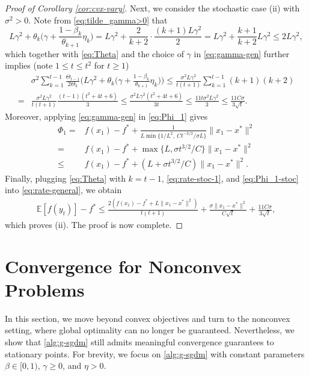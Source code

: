 \documentclass[10pt]{article}
\numberwithin{equation}{section}
\theoremstyle{definition}
\newcommand{\ebb}{\mathbb{E}}  %
\begin{document}
\begin{proof}[Proof of Corollary \ref{cor:cvx-vary}]
    Next, we consider the stochastic case (ii) with $\sigma^2>0$. Note from \eqref{eq:tilde_gamma>0} that
    \begin{equation*}
        L \gamma^2+\theta_k\Big(\gamma+\frac{1-\beta_k}{\theta_{k+1}}\eta_k\Big)= L\gamma^2+\frac{2}{k+2}\cdot\frac{(k+1) L \gamma^2}{2} = L\gamma^2+\frac{k+1}{k+2}L\gamma^2\leq 2L\gamma^2,
    \end{equation*}
    which together with \eqref{eq:Theta} and the choice of $\gamma$ in \eqref{eq:gamma-gen} further implies (note $1\leq t\leq t^2$ for $t\ge 1$)
    \begin{equation}\label{eq:rate-stoc-1}
        \begin{aligned}
            &\sigma^2\sum_{k=1}^{t-1}\frac{\Theta_{t-1}}{2\Theta_k}\Big(L \gamma^2+\theta_k\Big(\gamma+\frac{1-\beta_k}{\theta_{k+1}}\eta_k\Big)\Big)\leq \frac{\sigma^2L \gamma^2}{t(t+1)} \sum_{k=1}^{t-1}(k+1)(k+2)\\
            =&\frac{\sigma^2 L \gamma^2}{t(t+1)} \frac{(t-1)(t^2+4 t+6)}{3}\leq\frac{\sigma^2 L \gamma^2(t^2+4 t+6)}{3 t}\leq\frac{11t\sigma^2 L \gamma^2}{3}\leq\frac{11C\sigma}{3\sqrt{t}}.
        \end{aligned}
    \end{equation}
    Moreover, applying \eqref{eq:gamma-gen} in \eqref{eq:Phi_1} gives
    \begin{equation}\label{eq:Phi_1-stoc}
    \begin{aligned}
        \Phi_1=&f(x_1)-f^*+\frac{1}{L\min\{1/L^2,~C t^{-3/2}/\sigma L\}}\|x_1-x^*\|^2\\
        =&f(x_1)-f^*+\max\{L,\sigma t^{3/2}/C\}\|x_1-x^*\|^2\\
        \leq&f(x_1)-f^*+(L+\sigma t^{3/2}/C)\|x_1-x^*\|^2.
    \end{aligned}
    \end{equation}
    Finally, plugging \eqref{eq:Theta} with $k=t-1$, \eqref{eq:rate-stoc-1}, and \eqref{eq:Phi_1-stoc} into \eqref{eq:rate-general}, we obtain
    \begin{align*}
        \ebb[f(y_t)]-f^*\leq \frac{2(f(x_1)-f^*+L\|x_1-x^*\|^2)}{t(t+1)} + \frac{\sigma\|x_1-x^*\|^2}{C\sqrt{t}}+\frac{11C\sigma}{3\sqrt{t}},
    \end{align*}
    which proves (ii). The proof is now complete.
\end{proof}

\section{Convergence for Nonconvex Problems}
\label{sec:convergence-nc}
%
In this section, we move beyond convex objectives and turn to the nonconvex setting, where global optimality can no longer be guaranteed. Nevertheless, we show that \eqref{alg:g-sgdm} still admits meaningful convergence guarantees to stationary points.
For brevity, we focus on \eqref{alg:g-sgdm} with constant parameters $\beta\in[0,1)$, $\gamma\ge0$, and $\eta>0$. 
\end{document}

